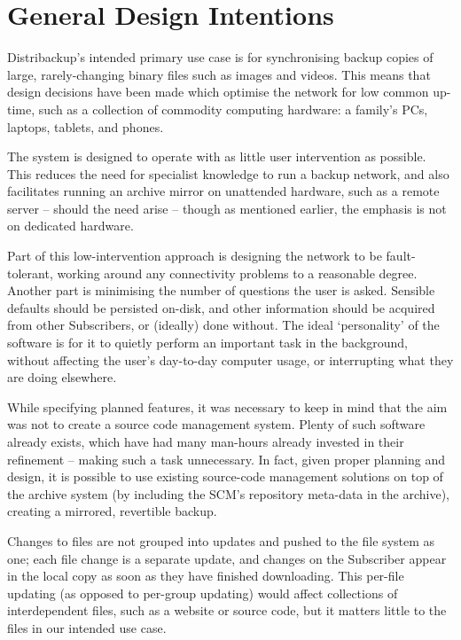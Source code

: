 \documentclass[12pt,a4paper,]{adreport}
\begin{document}
\section{General Design Intentions}\label{general-design-intentions}

Distribackup's intended primary use case is for synchronising backup
copies of large, rarely-changing binary files such as images and videos.
This means that design decisions have been made which optimise the
network for low common up-time, such as a collection of commodity
computing hardware: a family's PCs, laptops, tablets, and phones.

The system is designed to operate with as little user intervention as
possible. This reduces the need for specialist knowledge to run a backup
network, and also facilitates running an archive mirror on unattended
hardware, such as a remote server -- should the need arise -- though as
mentioned earlier, the emphasis is not on dedicated hardware.

Part of this low-intervention approach is designing the network to be
fault-tolerant, working around any connectivity problems to a reasonable
degree. Another part is minimising the number of questions the user is
asked. Sensible defaults should be persisted on-disk, and other
information should be acquired from other Subscribers, or (ideally) done
without. The ideal `personality' of the software is for it to quietly
perform an important task in the background, without affecting the
user's day-to-day computer usage, or interrupting what they are doing
elsewhere.

While specifying planned features, it was necessary to keep in mind that
the aim was not to create a source code management system. Plenty of
such software already exists, which have had many man-hours already
invested in their refinement -- making such a task unnecessary. In fact,
given proper planning and design, it is possible to use existing
source-code management solutions on top of the archive system (by
including the SCM's repository meta-data in the archive), creating a
mirrored, revertible backup.

Changes to files are not grouped into updates and pushed to the file
system as one; each file change is a separate update, and changes on the
Subscriber appear in the local copy as soon as they have finished
downloading. This per-file updating (as opposed to per-group updating)
would affect collections of interdependent files, such as a website or
source code, but it matters little to the files in our intended use
case.
\end{document}
